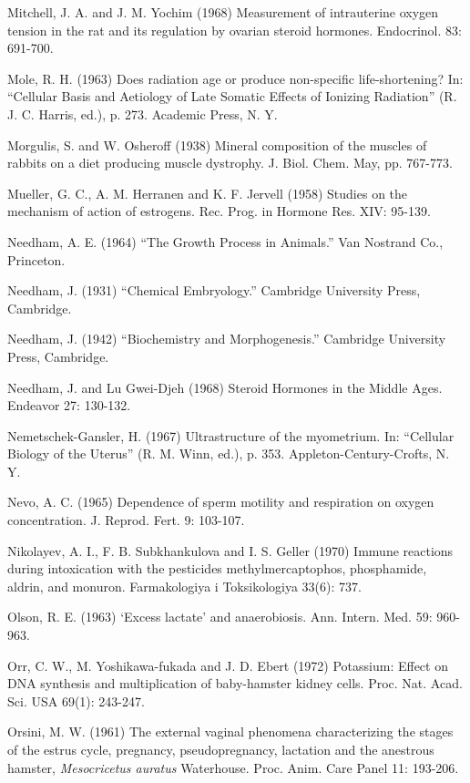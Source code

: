 Mitchell, J. A. and J. M. Yochim (1968) Measurement of intrauterine oxygen tension in the rat and its regulation by ovarian steroid hormones. Endocrinol. 83: 691-700.

Mole, R. H. (1963) Does radiation age or produce non-specific life-shortening? In: ``Cellular Basis and Aetiology of Late Somatic Effects of Ionizing Radiation'' (R. J. C. Harris, ed.), p. 273. Academic Press, N. Y.

Morgulis, S. and W. Osheroff (1938) Mineral composition of the muscles of rabbits on a diet producing muscle dystrophy. J. Biol. Chem. May, pp. 767-773.

Mueller, G. C., A. M. Herranen and K. F. Jervell (1958) Studies on the mechanism of action of estrogens. Rec. Prog. in Hormone Res. XIV: 95-139.

Needham, A. E. (1964) ``The Growth Process in Animals.'' Van Nostrand Co., Princeton.

Needham, J. (1931) ``Chemical Embryology.'' Cambridge University Press, Cambridge.

Needham, J. (1942) ``Biochemistry and Morphogenesis.'' Cambridge University Press, Cambridge.

Needham, J. and Lu Gwei-Djeh (1968) Steroid Hormones in the Middle Ages. Endeavor 27: 130-132.

Nemetschek-Gansler, H. (1967) Ultrastructure of the myometrium. In: ``Cellular Biology of the Uterus'' (R. M. Winn, ed.), p. 353. Appleton-Century-Crofts, N. Y.

Nevo, A. C. (1965) Dependence of sperm motility and respiration on oxygen concentration. J. Reprod. Fert. 9: 103-107.

Nikolayev, A. I., F. B. Subkhankulova and I. S. Geller (1970) Immune reactions during intoxication with the pesticides methylmercaptophos, phosphamide, aldrin, and monuron. Farmakologiya i Toksikologiya 33(6): 737.

Olson, R. E. (1963) `Excess lactate' and anaerobiosis. Ann. Intern. Med. 59: 960-963.

Orr, C. W., M. Yoshikawa-fukada and J. D. Ebert (1972) Potassium: Effect on DNA synthesis and multiplication of baby-hamster kidney cells. Proc. Nat. Acad. Sci. USA 69(1): 243-247.

Orsini, M. W. (1961) The external vaginal phenomena characterizing the stages of the estrus cycle, pregnancy, pseudopregnancy, lactation and the anestrous hamster, \textit{Mesocricetus auratus} Waterhouse. Proc. Anim. Care Panel 11: 193-206.

